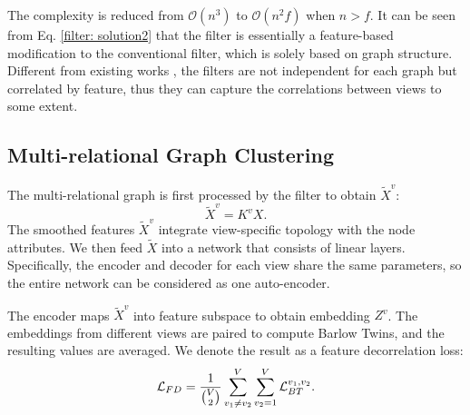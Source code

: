 \documentclass[letterpaper]{article} %
\begin{document}
The complexity is reduced from $\mathcal{O}\left(n^3\right)$ to $\mathcal{O}\left(n^2 f\right)$ when $n>f$. It can be seen from Eq. \ref{filter: solution2} that the filter is essentially a feature-based modification to the conventional filter, which is solely based on graph structure. Different from existing works \cite{pan2021multi, lin2021graph}, the filters are not independent for each graph but correlated by feature, thus they can capture the correlations between views to some extent.


\subsection{Multi-relational Graph Clustering}

The multi-relational graph is first processed by the filter to obtain $\widetilde{X}^v$:
\begin{equation}
    \widetilde{X}^v = K^v X.
\end{equation}
The smoothed features $\widetilde{X}^v$ integrate view-specific topology with the node attributes. We then feed $\widetilde{X}$ into a network that consists of linear layers. Specifically, the encoder and decoder for each view share the same parameters, so the entire network can be considered as one auto-encoder.

The encoder maps $\widetilde{X}^{v}$ into feature subspace to obtain embedding $Z^v$. The embeddings from different views are paired to compute Barlow Twins, and the resulting values are averaged. We denote the result as a feature decorrelation loss:
\begin{equation}
\mathcal{L}_{FD} = \frac{1}{\tbinom{V}{2}}\sum^{V}_{v_1 \not= v_2}\sum^{V}_{v_2=1} \mathcal{L}^{v_1,v_2}_{BT}.
\end{equation}
\end{document}

